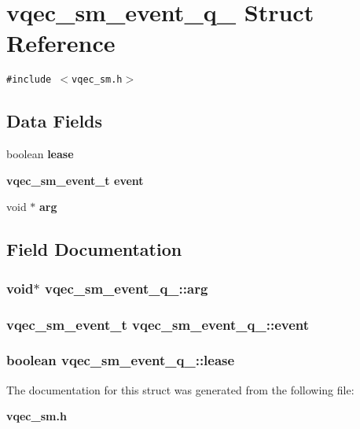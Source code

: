 \section{vqec\_\-sm\_\-event\_\-q\_\- Struct Reference}
\label{structvqec__sm__event__q__}
{\tt \#include $<$vqec\_\-sm.h$>$}

\subsection*{Data Fields}
\begin{CompactItemize}
\item 
boolean \bf{lease}
\item 
\bf{vqec\_\-sm\_\-event\_\-t} \bf{event}
\item 
void $\ast$ \bf{arg}
\end{CompactItemize}


\subsection{Field Documentation}
\subsubsection{\setlength{\rightskip}{0pt plus 5cm}void$\ast$ \bf{vqec\_\-sm\_\-event\_\-q\_\-::arg}}\label{structvqec__sm__event__q___545a5d66eeb28fa79d12a770ef884529}


\subsubsection{\setlength{\rightskip}{0pt plus 5cm}\bf{vqec\_\-sm\_\-event\_\-t} \bf{vqec\_\-sm\_\-event\_\-q\_\-::event}}\label{structvqec__sm__event__q___e7829a5b4dec9e480eddb6f2c0b17e73}


\subsubsection{\setlength{\rightskip}{0pt plus 5cm}boolean \bf{vqec\_\-sm\_\-event\_\-q\_\-::lease}}\label{structvqec__sm__event__q___0e4759b1716617d633e43a80fcd63b18}




The documentation for this struct was generated from the following file:\begin{CompactItemize}
\item 
\bf{vqec\_\-sm.h}\end{CompactItemize}

